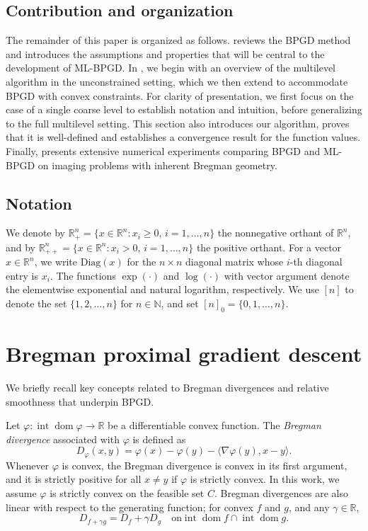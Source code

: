 \documentclass[11pt,reqno]{amsart}
\numberwithin{equation}{section}
\numberwithin{figure}{section}
\theoremstyle{plain}
\theoremstyle{definition}
\newcommand{\N}{\mathbb{N}}
\newcommand{\la}{\langle}
\newcommand{\ra}{\rangle}
\newcommand{\vphi}{\varphi}
\newcommand{\dvphi}{\nabla \vphi}
\DeclareMathOperator{\dom}{dom}
\DeclareMathOperator{\intr}{int}
\begin{document}
\subsection*{Contribution and organization}
The remainder of this paper is organized as follows.  reviews the BPGD method and introduces the assumptions and properties that will be central to the development of ML-BPGD. In , we begin with an overview of the multilevel algorithm in the unconstrained setting, which we then extend to accommodate BPGD with convex constraints. For clarity of presentation, we first focus on the case of a single coarse level to establish notation and intuition, before generalizing to the full multilevel setting. This section also introduces our algorithm, proves that it is well-defined and establishes a convergence result for the function values. Finally,  presents extensive numerical experiments comparing BPGD and ML-BPGD on imaging problems with inherent Bregman geometry.

\subsection*{Notation}
We denote by $\mathbb{R}^n_+ = \{ x \in \mathbb{R}^n : x_i \geq 0, \, i=1,\ldots,n \}$ the nonnegative orthant of $\mathbb{R}^n$, and by $\mathbb{R}^n_{++} = \{ x \in \mathbb{R}^n : x_i > 0, \, i=1,\ldots,n \}$ the positive orthant. For a vector $x \in \mathbb{R}^n$, we write $\mathrm{Diag}(x)$ for the $n \times n$ diagonal matrix whose $i$-th diagonal entry is $x_i$. The functions $\exp(\cdot)$ and $\log(\cdot)$ with vector argument denote the elementwise exponential and natural logarithm, respectively. We use $[n]$ to denote the set $\{1, 2, \ldots, n\}$ for $n \in \N$, and set $[n]_0 = \{0, 1, \ldots, n\}$.



\section{Bregman proximal gradient descent}\label{sec:preliminaries}
We briefly recall key concepts related to Bregman divergences and relative smoothness that underpin BPGD. 

Let $\vphi: \intr \dom \vphi \to \mathbb{R}$ be a differentiable convex function. The \emph{Bregman divergence} associated with $\vphi$ is defined as
\begin{equation}
    D_\vphi(x,y) = \vphi(x) - \vphi(y) - \la \dvphi(y), x-y \ra.
\end{equation}
Whenever $\vphi$ is convex, the Bregman divergence is convex in its first argument, 
and it is strictly positive for all $x \neq y$ if $\vphi$ is strictly convex.
In this work, we assume $\vphi$ is strictly convex on the feasible set $C$. Bregman divergences are also linear with respect to the generating function; for convex $f$ and $g$, and any $\gamma \in \mathbb{R}$,
\begin{equation} \label{eq: linearity-Bregman-div}
    D_{f+\gamma g} = D_f + \gamma D_g \quad \text{on} \intr \dom f \cap \intr \dom g .
\end{equation} 
\end{document}

